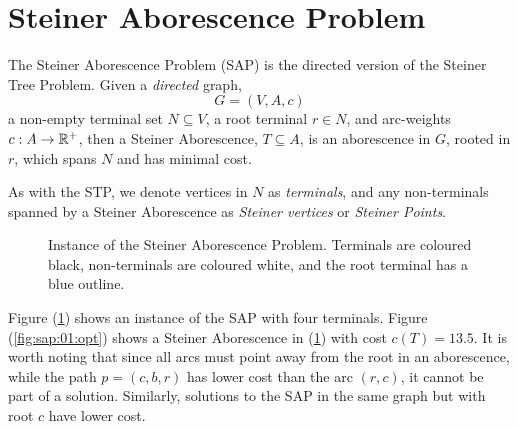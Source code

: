 \section{Steiner Aborescence Problem}
The Steiner Aborescence Problem (SAP) is the directed version of the Steiner Tree Problem.
Given a \textit{directed} graph,
$$G = (V, A, c)$$
a non-empty terminal set $N \subseteq V$, a root terminal $r \in N$, and arc-weights $c : A \to \mathbb{R}^+$,
then a Steiner Aborescence, $T \subseteq A$, is an aborescence
in $G$, rooted in $r$, which spans $N$ and has minimal cost.

As with the STP, we denote vertices in $N$ as \textit{terminals}, and any non-terminals spanned by a Steiner Aborescence as
 \textit{Steiner vertices} or \textit{Steiner Points}.
\begin{figure}[h]\centering
{}
\caption{Instance of the Steiner Aborescence Problem. Terminals are coloured black, non-terminals are coloured white, and the root terminal
  has a blue outline.}
\label{fig:sap:01}
\end{figure}

Figure (\ref{fig:sap:01}) shows an instance of the SAP with four terminals. Figure (\ref{fig:sap:01:opt}) shows a Steiner Aborescence in (\ref{fig:sap:01})
with cost $c(T) = 13.5$. It is worth noting that since all arcs must point away from the root in an aborescence, while the path $p = (c, b, r)$  has
 lower cost than the arc $(r, c)$, it cannot be part of a solution. Similarly, solutions to the SAP in the same graph but with root $c$ have lower cost.


